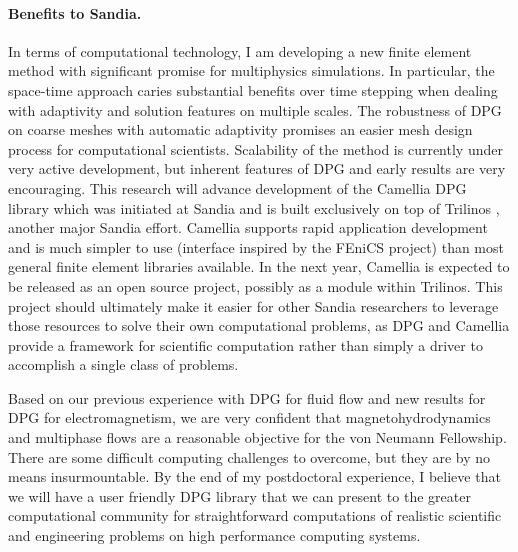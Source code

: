\documentclass[letterpaper,12pt]{article}
\begin{document}
\paragraph{Benefits to Sandia.}
In terms of computational technology, I am developing a new finite element method with significant promise for multiphysics simulations.
In particular, the space-time approach caries substantial benefits over time stepping when dealing with adaptivity and solution features on multiple scales.
The robustness of DPG on coarse meshes with automatic adaptivity promises an easier mesh design process for computational scientists.
Scalability of the method is currently under very active development, but inherent features of DPG and early results are very encouraging.
This research will advance development of the Camellia \cite{CamelliaDPG} DPG library which was initiated at Sandia 
and is built exclusively on top of Trilinos \cite{Trilinos}, another major Sandia effort.
Camellia supports rapid application development and is much simpler to use (interface inspired by the FEniCS project) 
than most general finite element libraries available.
In the next year, Camellia is expected to be released as an open source project, possibly as a module within Trilinos.
This project should ultimately
make it easier for other Sandia researchers to leverage those resources to solve their own computational problems,
as DPG and Camellia provide a framework for scientific computation rather than simply a driver to accomplish a single class of problems.

Based on our previous experience with DPG for fluid flow and new results for DPG for electromagnetism, we are very confident
that magnetohydrodynamics and multiphase flows are a reasonable objective for the von Neumann Fellowship.
There are some difficult computing challenges to overcome, but they are by no means insurmountable.
By the end of my postdoctoral experience, I believe that we will have a user friendly DPG library that we can present to the greater 
computational community for straightforward computations of realistic scientific and engineering problems on high performance computing systems.

 

\end{document}
